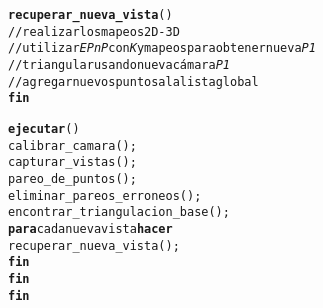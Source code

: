 \begin{alltt}
  \textbf{recuperar_nueva_vista}()
    // realizar los mapeos 2D-3D
    // utilizar \textit{EPnP} con \textit{K} y mapeos para obtener nueva \textit{P1}
    // triangular usando nueva c\'{a}mara \textit{P1}
    // agregar nuevos puntos a la lista global
  \textbf{fin}

  \textbf{ejecutar}()
    calibrar_camara();
    capturar_vistas();
    pareo_de_puntos();
    eliminar_pareos_erroneos();
    encontrar_triangulacion_base();
    \textbf{para} cada nueva vista \textbf{hacer}
      recuperar_nueva_vista();
    \textbf{fin}
  \textbf{fin}
\textbf{fin}
\end{alltt}
